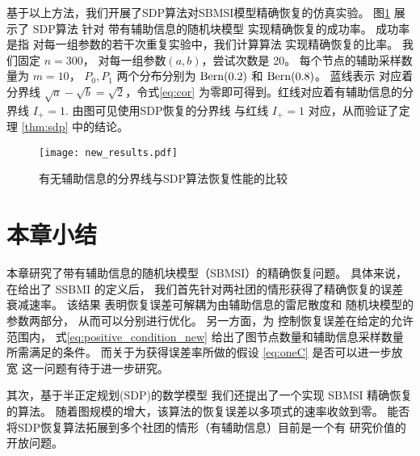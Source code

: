 基于以上方法，我们开展了SDP算法对SBMSI模型精确恢复的仿真实验。
图\ref{fig:my_label} 展示了 SDP算法
针对 带有辅助信息的随机块模型 实现精确恢复的成功率。
成功率是指 对每一组参数的若干次重复实验中，我们计算算法
实现精确恢复的比率。
我们固定 $n=300$， 对每一组参数$(a,b)$，尝试次数是 20。
每个节点的辅助采样数量为 $m=10$，
$P_0,P_1$ 两个分布分别为 $\operatorname{Bern}(0.2)$ 和 $\operatorname{Bern}(0.8)$。
蓝线表示 对应着分界线 $\sqrt{a}-\sqrt{b}=\sqrt{2}$，令式\eqref{eq:cor}
为零即可得到。红线对应着有辅助信息的分界线 $I_+ = 1$.
由图可见使用SDP恢复的分界线 与红线 $I_+ = 1$ 对应，从而验证了定理
\ref{thm:sdp} 中的结论。
\begin{figure}[!ht]
    \centering
    \texttt{[image: new\_results.pdf]}
    \caption{有无辅助信息的分界线与SDP算法恢复性能的比较}
    \label{fig:my_label}
\end{figure}

\section{本章小结}\label{sec:summary_sbmsi}
本章研究了带有辅助信息的随机块模型（SBMSI）的精确恢复问题。
具体来说，在给出了 SSBMI 的定义后， 
我们首先针对两社团的情形获得了精确恢复的误差衰减速率。
该结果
表明恢复误差可解耦为由辅助信息的雷尼散度和
随机块模型的参数两部分，
从而可以分别进行优化。
另一方面，为
控制恢复误差在给定的允许范围内，
式\eqref{eq:positive_condition_new}
给出了图节点数量和辅助信息采样数量所需满足的条件。
而关于为获得误差率所做的假设 \eqref{eq:oneC} 是否可以进一步放宽
这一问题有待于进一步研究。

其次，基于半正定规划(SDP)的数学模型
我们还提出了一个实现 SBMSI 精确恢复的算法。
随着图规模的增大，该算法的恢复误差以多项式的速率收敛到零。
能否将SDP恢复算法拓展到多个社团的情形（有辅助信息）目前是一个有
研究价值的开放问题。
